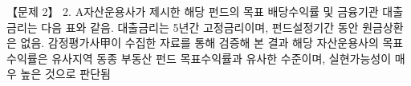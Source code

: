 \begin{longquestion}{【문제 2】}
2. A자산운용사가 제시한 해당 펀드의 목표 배당수익률 및 금융기관 대출금리는 다음 표와 같음. 대출금리는 5년간 고정금리이며, 펀드설정기간 동안 원금상환은 없음. 감정평가사甲이 수집한 자료를 통해 검증해 본 결과 해당 자산운용사의 목표수익률은 유사지역 동종 부동산 펀드 목표수익률과 유사한 수준이며, 실현가능성이 매우 높은 것으로 판단됨 \par
{\small\centering\renewcommand{\arraystretch}{1.25}
\par}


\end{longquestion}
